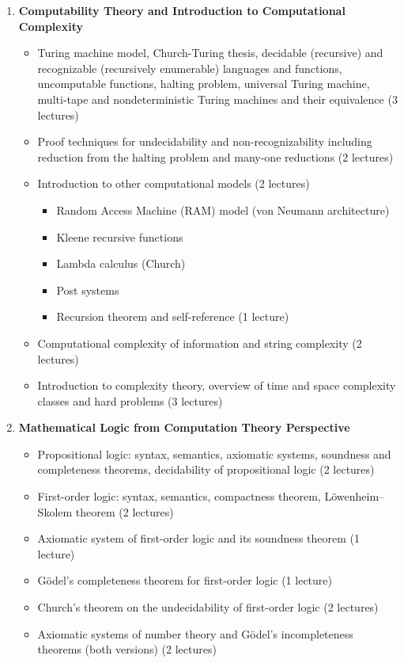 \documentclass[12pt]{article}
\begin{document}
\begin{enumerate}
    \item \textbf{Computability Theory and Introduction to Computational Complexity}
    \begin{itemize}
        \item Turing machine model, Church-Turing thesis, decidable (recursive) and recognizable (recursively enumerable) languages and functions, uncomputable functions, halting problem, universal Turing machine, multi-tape and nondeterministic Turing machines and their equivalence (3 lectures)
        \item Proof techniques for undecidability and non-recognizability including reduction from the halting problem and many-one reductions (2 lectures)
        \item Introduction to other computational models (2 lectures)
        \begin{itemize}
            \item Random Access Machine (RAM) model (von Neumann architecture)
            \item Kleene recursive functions
            \item Lambda calculus (Church)
            \item Post systems
            \item Recursion theorem and self-reference (1 lecture)
        \end{itemize}
        \item Computational complexity of information and string complexity (2 lectures)
        \item Introduction to complexity theory, overview of time and space complexity classes and hard problems (3 lectures)
    \end{itemize}
    
    \item \textbf{Mathematical Logic from Computation Theory Perspective}
    \begin{itemize}
        \item Propositional logic: syntax, semantics, axiomatic systems, soundness and completeness theorems, decidability of propositional logic (2 lectures)
        \item First-order logic: syntax, semantics, compactness theorem, Löwenheim–Skolem theorem (2 lectures)
        \item Axiomatic system of first-order logic and its soundness theorem (1 lecture)
        \item Gödel's completeness theorem for first-order logic (1 lecture)
        \item Church's theorem on the undecidability of first-order logic (2 lectures)
        \item Axiomatic systems of number theory and Gödel’s incompleteness theorems (both versions) (2 lectures)
    \end{itemize}


\end{enumerate}
\end{document}
